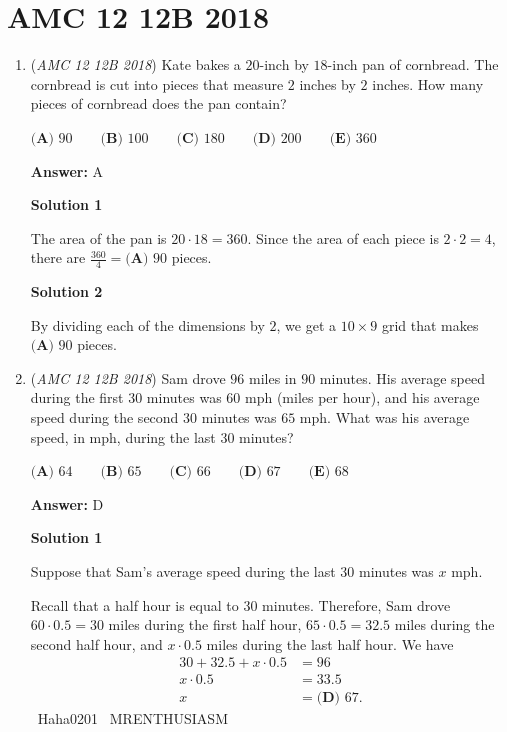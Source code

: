 \section{AMC 12 12B 2018}
        \begin{enumerate}
        	\item (\textit{AMC 12 12B 2018}) Kate bakes a $20$-inch by $18$-inch pan of cornbread. The cornbread is cut into pieces that measure $2$ inches by $2$ inches. How many pieces of cornbread does the pan contain?


 $\textbf{(A) } 90 \qquad \textbf{(B) } 100 \qquad \textbf{(C) } 180 \qquad \textbf{(D) } 200 \qquad \textbf{(E) } 360$

 \textbf{Answer: }A



\textbf{Solution 1}

The area of the pan is $20\cdot18=360$. Since the area of each piece is $2\cdot2=4$, there are $\frac{360}{4} = \boxed{\textbf{(A) } 90}$ pieces.

 



\textbf{Solution 2}

By dividing each of the dimensions by $2$, we get a $10\times9$ grid that makes $\boxed{\textbf{(A) } 90}$ pieces.

 


	\item (\textit{AMC 12 12B 2018}) Sam drove $96$ miles in $90$ minutes. His average speed during the first $30$ minutes was $60$ mph (miles per hour), and his average speed during the second $30$ minutes was $65$ mph. What was his average speed, in mph, during the last $30$ minutes?


 $\textbf{(A) } 64 \qquad \textbf{(B) } 65 \qquad \textbf{(C) } 66 \qquad \textbf{(D) } 67 \qquad \textbf{(E) } 68$

 \textbf{Answer: }D



\textbf{Solution 1}

Suppose that Sam's average speed during the last $30$ minutes was $x$ mph.

 Recall that a half hour is equal to $30$ minutes. Therefore, Sam drove $60\cdot0.5=30$ miles during the first half hour, $65\cdot0.5=32.5$ miles during the second half hour, and $x\cdot0.5$ miles during the last half hour. We have 
 \begin{align*} 30+32.5+x\cdot0.5&=96 \\ x\cdot0.5&=33.5 \\ x&=\boxed{\textbf{(D) } 67}. \end{align*}
~Haha0201 ~MRENTHUSIASM


\end{enumerate}
